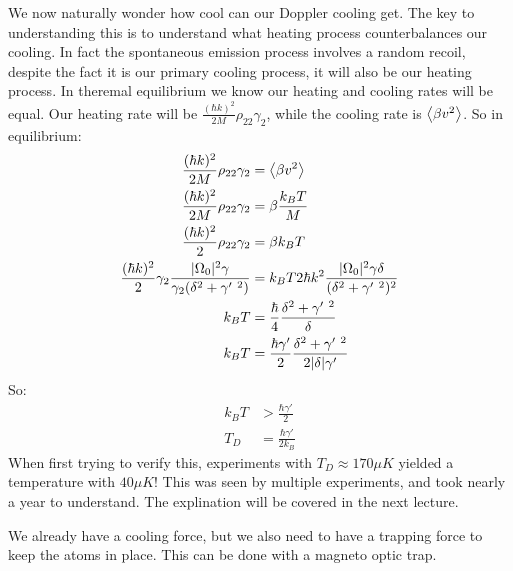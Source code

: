 We now naturally wonder how cool can our Doppler cooling get. The key to understanding this is to understand what heating process counterbalances our cooling.
In fact the spontaneous emission process involves a random recoil, despite the fact it is our primary cooling process, it will also be our heating process.
In theremal equilibrium we know our heating and cooling rates will be equal. Our heating rate will be $\frac{(\hbar k)^2}{2M} \rho_{22}\gamma_2$, while the cooling rate is $\expval{\beta v^2}$. So in equilibrium:
\begin{align*}
	\frac{(\hbar k)^2}{2M} \rho_{22} \gamma_2 &= \expval{\beta v^2} \\
	\frac{(\hbar k)^2}{2M} \rho_{22} \gamma_2 &= \beta \frac{k_B T}{M} \\
	\frac{(\hbar k)^2}{2} \rho_{22} \gamma_2 &= \beta k_B T \\
	\frac{(\hbar k)^2}{2} \gamma_2 \frac{|\Omega_0|^2 \gamma}{\gamma_2(\delta^2 + \gamma'\ ^2)} &= k_B T 2\hbar k^2 \frac{|\Omega_0|^2 \gamma \delta}{(\delta^2 +\gamma'\ ^2)^2} \\
	k_B T &= \frac{\hbar}{4} \frac{\delta^2 + \gamma'\ ^2}{\delta} \\
	k_B T &= \frac{\hbar\gamma'}{2} \frac{\delta^2 + \gamma'\ ^2}{2|\delta|\gamma'}
\end{align*}
So:
\begin{align*}
	k_B T &> \frac{\hbar\gamma'}{2} \\
	T_D &= \frac{\hbar\gamma'}{2k_B}
\end{align*}
When first trying to verify this, experiments with $T_D \approx 170 \mu K$ yielded a temperature with $40 \mu K$! This was seen by multiple experiments, and took nearly a year to understand. The explination will be covered in the next lecture.

We already have a cooling force, but we also need to have a trapping force to keep the atoms in place. This can be done with a magneto optic trap.
